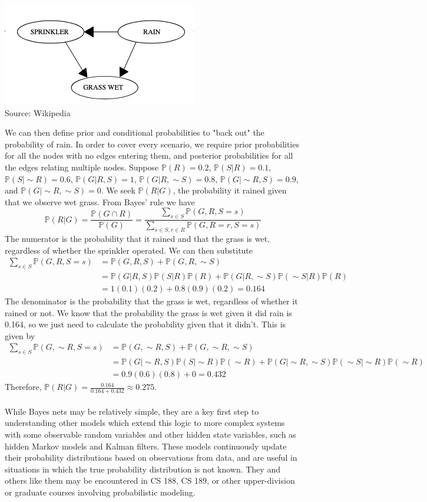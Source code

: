 \documentclass{article}
\newcommand{\PrMe}{\mathbb{P}}
\begin{document}
\begin{center}
    \includegraphics[width=.6\textwidth]{figures/image1.png}\\
    Source: Wikipedia 
\end{center}
\noindent We can then define prior and conditional probabilities to "back out" the probability of rain. In order to cover every scenario, we require prior probabilities for all the nodes with no edges entering them, and posterior probabilities for all the edges relating multiple nodes. Suppose $\PrMe(R) = 0.2$, $\PrMe(S|R) = 0.1$, $\PrMe(S|\sim R) = 0.6$, $\PrMe(G|R, S) = 1$, $\PrMe(G|R, \sim S) = 0.8$, $\PrMe(G | \sim R, S) = 0.9$, and $\PrMe(G|\sim R, \sim S) = 0$. We seek $\PrMe(R|G)$, the probability it rained given that we observe wet grass. From Bayes' rule we have
$$\PrMe(R|G) = \frac{\PrMe(G \cap R)}{\PrMe(G)} = \frac{\sum_{s \in S}\PrMe(G, R, S=s)}{\sum_{s \in S, r \in R}\PrMe(G, R=r, S=s)}$$
The numerator is the probability that it rained and that the grass is wet, regardless of whether the sprinkler operated. We can then substitute
\begin{align*}
\sum_{s \in S}\PrMe(G, R, S=s) &= \PrMe(G, R, S) + \PrMe(G, R, \sim S) \\
&= \PrMe(G | R, S)\PrMe(S | R)\PrMe(R) + \PrMe(G|R, \sim S)\PrMe(\sim S | R)\PrMe(R) \\
&= 1(0.1)(0.2) + 0.8(0.9)(0.2) = 0.164
\end{align*}
The denominator is the probability that the grass is wet, regardless of whether it rained or not. We know that the probability the grass is wet given it did rain is 0.164, so we just need to calculate the probability given that it didn't. This is given by
\begin{align*}
\sum_{s \in S}\PrMe(G, \sim R, S=s) &= \PrMe(G, \sim R, S) + \PrMe(G, \sim R, \sim S) \\
&= \PrMe(G | \sim R, S)\PrMe(S | \sim R)\PrMe(\sim R) + \PrMe(G| \sim R, \sim S)\PrMe(\sim S | \sim R)\PrMe(\sim R) \\
&= 0.9(0.6)(0.8) + 0 = 0.432
\end{align*}
Therefore, $\PrMe (R | G) = \frac{0.164}{0.164 + 0.432} \approx 0.275$. \\\\
While Bayes nets may be relatively simple, they are a key first step to understanding other models which extend this logic to more complex systems with some observable random variables and other hidden state variables, such as hidden Markov models and Kalman filters. These models continuously update their probability distributions based on observations from data, and are useful in situations in which the true probability distribution is not known. They and others like them may be encountered in CS 188, CS 189, or other upper-division or graduate courses involving probabilistic modeling.
\end{document}
